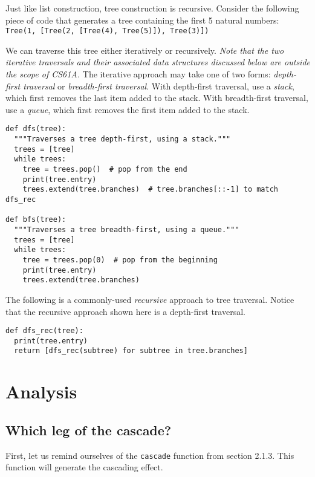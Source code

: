 \documentclass[a4paper]{book}
\begin{document}
Just like list construction, tree construction is recursive. Consider the following piece of code that generates a tree containing the first 5 natural numbers: {\tt Tree(1, [Tree(2, [Tree(4), Tree(5)]), Tree(3)])}

We can traverse this tree either iteratively or recursively. \textit{Note that the two iterative traversals and their associated data structures discussed below are outside the scope of CS61A.} The iterative approach may take one of two forms: \textit{depth-first traversal} or \textit{breadth-first traversal}. With depth-first traversal, use a \textit{stack}, which first removes the last item added to the stack. With breadth-first traversal, use a \textit{queue}, which first removes the first item added to the stack.

\begin{lstlisting}
def dfs(tree):
  """Traverses a tree depth-first, using a stack."""
  trees = [tree]
  while trees:
    tree = trees.pop()  # pop from the end
    print(tree.entry)
    trees.extend(tree.branches)  # tree.branches[::-1] to match dfs_rec

def bfs(tree):
  """Traverses a tree breadth-first, using a queue."""
  trees = [tree]
  while trees:
    tree = trees.pop(0)  # pop from the beginning
    print(tree.entry)
    trees.extend(tree.branches)
\end{lstlisting}

The following is a commonly-used \textit{recursive} approach to tree traversal. Notice that the recursive approach shown here is a depth-first traversal.

\begin{lstlisting}
def dfs_rec(tree):
  print(tree.entry)
  return [dfs_rec(subtree) for subtree in tree.branches]
\end{lstlisting}

\pagebreak \newpage

\section{Analysis}

\subsection{Which leg of the cascade?}

First, let us remind ourselves of the {\tt cascade} function from section 2.1.3. This function will generate the cascading effect.
\end{document}
